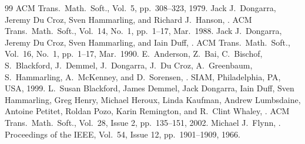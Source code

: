 \begin{thebibliography}{99}
  ACM Trans.\ Math.\ Soft., Vol.\ 5, pp.\ 308--323, 1979.
  Jack J.\ Dongarra, Jeremy Du Croz, Sven Hammarling, and Richard J.\ Hanson,
  .
  ACM Trans.\ Math.\ Soft., Vol.\ 14, No.\ 1, pp.\ 1--17, Mar.\ 1988.
  Jack J.\ Dongarra, Jeremy Du Croz, Sven Hammarling, and Iain Duff,
  .
  ACM Trans.\ Math.\ Soft., Vol.\ 16, No.\ 1, pp.\ 1--17, Mar.\ 1990.
  E.\ Anderson, Z.\ Bai, C.\ Bischof, S.\ Blackford, J.\ Demmel, J.\ Dongarra,
  J.\ Du Croz, A.\ Greenbaum, S.\ Hammarling, A.\ McKenney, and D.\ Sorensen,
  .
  SIAM, Philadelphia, PA, USA, 1999.
  L.\ Susan Blackford, James Demmel, Jack Dongarra, Iain Duff, Sven Hammarling,
  Greg Henry, Michael Heroux, Linda Kaufman, Andrew Lumbsdaine, Antoine Petitet,
  Roldan Pozo, Karin Remington, and R.\ Clint Whaley,
  .
  ACM Trans.\ Math.\ Soft., Vol.\ 28, Issue 2, pp.\ 135--151, 2002.
  Michael J.\ Flynn,
  .
  Proceedings of the IEEE, Vol.\ 54, Issue 12, pp.\ 1901--1909, 1966.
\end{thebibliography}

\let\realglossitem\glossitem
\renewcommand{\glossitem}[4]{\hangpara{4em}{1}\realglossitem{#1}{#2}{#3}{#4}}

\clearpage
\renewcommand{\glossaryname}{Cross-references}
\renewcommand{\preglossaryhook}{Each clause and subclause label is listed below along with the
corresponding clause or subclause number and page number, in alphabetical order by label.\\}
\twocolglossary
\renewcommand{\leftmark}{\glossaryname}
{
\raggedright
\printglossary[xrefindex]
}

\clearpage

\renewcommand{\glossaryname}{Cross-references from ISO \CppXVII{}}
\renewcommand{\preglossaryhook}{All clause and subclause labels from
ISO \CppXVII{} (ISO/IEC 14882:2017, \doccite{Programming Languages --- \Cpp{}})
are present in this document, with the exceptions described below.\\}
\renewcommand{\leftmark}{\glossaryname}
{
\raggedright
\printglossary[xrefdelta]
}

\clearpage
\renewcommand{\leftmark}{\indexname}
\renewcommand{\preindexhook}{Constructions whose name appears in \exposid{monospaced italics} are for exposition only.\\}
{
\raggedright
\printindex[generalindex]
}


